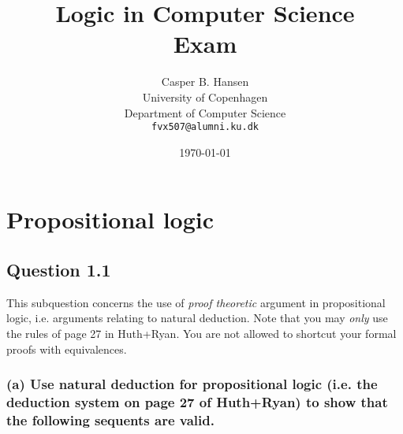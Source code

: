 \documentclass[10pt,a4paper]{article}
\title
{
	{\Large Logic in Computer Science}\\
	Exam
}
\author
{
	Casper B. Hansen\\
	University of Copenhagen\\
	Department of Computer Science\\
	{\tt fvx507@alumni.ku.dk}
}
\date{\today}
\begin{document}
\maketitle

\section{Propositional logic}
\subsection*{Question 1.1}
This subquestion concerns the use of {\it proof theoretic} argument in
propositional logic, i.e. arguments relating to natural deduction. Note that
you may {\it only} use the rules of page 27 in Huth+Ryan. You are not allowed
to shortcut your formal proofs with equivalences.
\subsubsection*{(a) \mdseries Use natural deduction for propositional logic
(i.e. the deduction system on page 27 of Huth+Ryan) to show that the following
sequents are valid.}
\end{document}
